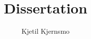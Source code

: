 \documentclass[a4paper, 12pt, draft]{scrartcl}
\begin{document}
\title{Dissertation}
\author{Kjetil Kjernsmo}


\maketitle








\end{document}
